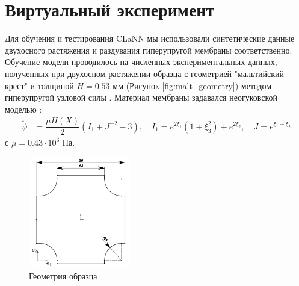 \section{Виртуальный эксперимент}

Для обучения и тестирования CLaNN мы использовали синтетические  данные двухосного растяжения и раздувания гиперупругой мембраны соответственно.
Обучение модели проводилось на численных экспериментальных данных, 
полученных при двухосном растяжении образца с геометрией "мальтийский крест" и толщиной $H=0.53$ мм (Рисунок \ref{fig:malt_geometry}) методом гиперупругой узловой силы \cite{ddaniso2024}. 
Материал мембраны задавался неогуковской моделью \cite{ogden1997nonlinear}:
\begin{align} \label{eq:neohook}
        \widetilde{\psi} &= \dfrac{\mu H(X)}{2} (I_1 +J^{-2}-3),
        \quad     I_1 = e^{2\xi_1} (1+\xi_3^2)+e^{2\xi_2},\quad J = e^{\xi_1+\xi_2}
\end{align}
с $\mu=0.43\cdot 10^6$ Па.



\begin{figure}[H]
  \centering
  \includegraphics[width=0.4\textwidth]{img/malt_geom.png}
  \caption{Геометрия образца}
  \label{fig:malt_geometry}
  \label{fig:malt_displacements}
\end{figure}

